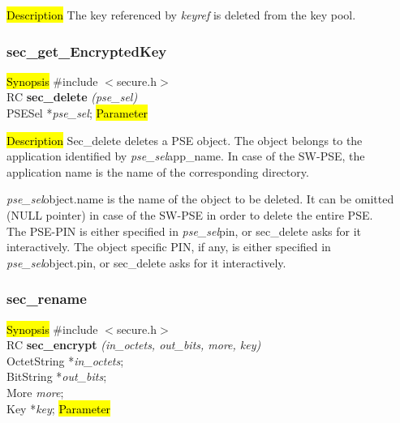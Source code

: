 \hl{Description}
The key referenced by {\em keyref} is deleted from the key pool.

\subsubsection{sec\_get\_EncryptedKey}
\label{sec_delete}
\hl{Synopsis}
\#include $<$secure.h$>$ \\ [0.5cm]
RC {\bf sec\_delete} {\em (pse\_sel)} \\
PSESel *{\em pse\_sel};
\hl{Parameter}

\hl{Description}
Sec\_delete deletes a PSE object. 
The object belongs to the application identified by {\em pse\_sel}\pf app\_name.
In case of the SW-PSE, the application name is the name of the corresponding directory. 

{\em pse\_sel}\pf object.name is the name of the object to be deleted. It can be omitted 
(NULL pointer) in case of the SW-PSE in order to delete the entire PSE. \\[1ex]
The PSE-PIN is either specified in
{\em pse\_sel}\pf pin, or sec\_delete asks for it interactively.
The object specific PIN, if any, is either specified in {\em pse\_sel}\pf object.pin, 
or sec\_delete asks for it interactively.

\subsubsection{sec\_rename}
\label{sec_encrypt}
\hl{Synopsis}
\#include $<$secure.h$>$ \\ [0.5cm]
RC {\bf sec\_encrypt} {\em (in\_octets, out\_bits, more, key)} \\
OctetString *{\em in\_octets}; \\
BitString *{\em out\_bits}; \\
More {\em more}; \\
Key *{\em key};
\hl{Parameter}



